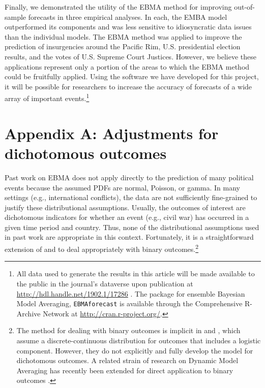 \documentclass[12pt,fullpage,endnotes]{article}
\newcommand{\note}[1]{\footnote{ #1 \vspace{4 mm}}}
\begin{document}
Finally, we demonstrated the utility of the EBMA method for improving
out-of-sample forecasts in three empirical analyses.  In each, the
EMBA model outperformed its components and was less sensitive to
idiosyncratic data issues than the individual models.  The EBMA method
was applied to improve the prediction of insurgencies around the
Pacific Rim, U.S. presidential election results, and the votes of
U.S. Supreme Court Justices. However, we believe these applications
represent only a portion of the areas to which the EBMA method could
be fruitfully applied.  Using the software we have developed for this
project, it will be possible for researchers to increase the accuracy
of forecasts of a wide array of important events.\note{All data used
  to generate the results in this article will be made available to
  the public in the journal's dataverse upon publication at
  \url{http://hdl.handle.net/1902.1/17286}
  \citep{Montgomery:2012}. The package for ensemble Bayesian Model
  Averaging, {\tt EBMAforecast} is available through the Comprehensive
  R-Archive Network at \url{http://cran.r-project.org/}.}



\newpage
\appendix


\section*{Appendix A: Adjustments for dichotomous outcomes}

Past work on EBMA does not apply directly to the prediction of many
political events because the assumed PDFs are normal, Poisson, or
gamma. In many settings (e.g., international conflicts), the data are
not sufficiently fine-grained to justify these distributional
assumptions.  Usually, the outcomes of interest are dichotomous
indicators for whether an event (e.g., civil war) has occurred in a
given time period and country. Thus, none of the distributional
assumptions used in past work are appropriate in this context.
Fortunately, it is a straightforward extension of
\citet{Sloughter:2007} and \citet{Sloughter:2010} to deal
appropriately with binary outcomes.\note{The method for dealing with
  binary outcomes is implicit in \citet{Sloughter:2007} and
  \citet{Sloughter:2010}, which assume a discrete-continuous
  distribution for outcomes that includes a logistic component.
  However, they do not explicitly and fully develop the model for
  dichotomous outcomes.  A related strain of research on Dynamic Model
  Averaging \citep[c.f.,][]{Raftery:2010, Muhlbaier:2007} has recently
  been extended for direct application to binary outcomes
  \citep[e.g.,][]{Mccormick:2011, Tomas:2011}.}
\end{document}
